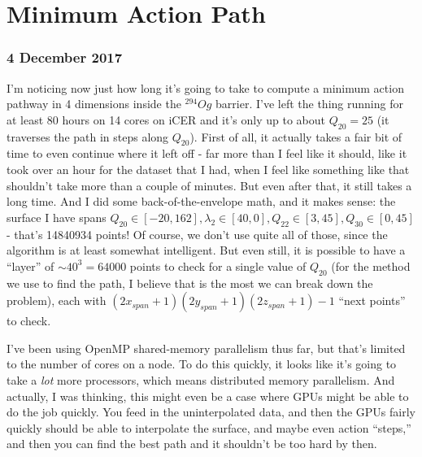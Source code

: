 \chapter{Minimum Action Path}
\maketitle

\subsection*{4 December 2017}
I'm noticing now just how long it's going to take to compute a minimum action pathway in 4 dimensions inside the $^{294}Og$ barrier. I've left the thing running for at least 80 hours on 14 cores on iCER and it's only up to about $Q_{20}=25$ (it traverses the path in steps along $Q_{20}$). First of all, it actually takes a fair bit of time to even continue where it left off - far more than I feel like it should, like it took over an hour for the dataset that I had, when I feel like something like that shouldn't take more than a couple of minutes. But even after that, it still takes a long time. And I did some back-of-the-envelope math, and it makes sense: the surface I have spans $Q_{20}\in[-20,162], \lambda_2\in[40,0], Q_{22}\in[3,45], Q_{30}\in[0,45]$ - that's 14840934 points! Of course, we don't use quite all of those, since the algorithm is at least somewhat intelligent. But even still, it is possible to have a ``layer'' of $\sim40^3=64000$ points to check for a single value of $Q_{20}$ (for the method we use to find the path, I believe that is the most we can break down the problem), each with $(2x_{span}+1)(2y_{span}+1)(2z_{span}+1)-1$ ``next points'' to check.

I've been using OpenMP shared-memory parallelism thus far, but that's limited to the number of cores on a node. To do this quickly, it looks like it's going to take a \textit{lot} more processors, which means distributed memory parallelism. And actually, I was thinking, this might even be a case where GPUs might be able to do the job quickly. You feed in the uninterpolated data, and then the GPUs fairly quickly should be able to interpolate the surface, and maybe even action ``steps,'' and then you can find the best path and it shouldn't be too hard by then.
